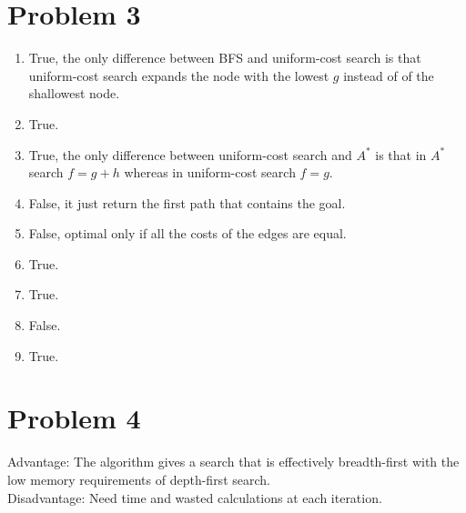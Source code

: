 \documentclass{article}
\begin{document}
\section*{Problem 3}
\begin{enumerate}[label=(\alph*)]
\item True, the only difference between BFS and uniform-cost search is that uniform-cost search expands the node with the lowest $g$ instead of of the shallowest node.
\item True.
\item True, the only difference between uniform-cost search and $A^*$ is that in $A^*$ search $f=g+h$ whereas in uniform-cost search $f=g$.
\item False, it just return the first path that contains the goal.
\item False, optimal only if all the costs of the edges are equal.
\item True.
\item True.
\item False.
\item True.
\end{enumerate}

\section*{Problem 4}
Advantage: The algorithm gives a search that is effectively breadth-first with the low memory requirements of depth-first search.\\
Disadvantage: Need time and wasted calculations at each iteration.
\end{document}
